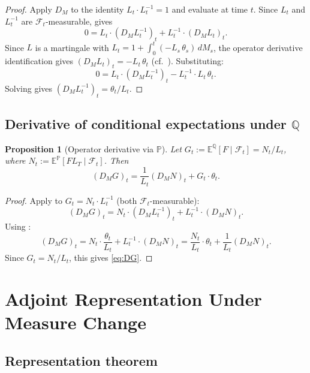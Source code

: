 \documentclass[11pt]{article}
\theoremstyle{plain}
\newtheorem{proposition}{Proposition}[section]
\theoremstyle{definition}
\theoremstyle{remark}
\newcommand{\E}{\mathbb{E}}
\newcommand{\F}{\mathcal{F}}
\newcommand{\PP}{\mathbb{P}}
\newcommand{\QQ}{\mathbb{Q}}
\begin{document}
\begin{proof}
Apply $D_M$ to the identity $L_t \cdot L_t^{-1} = 1$ and evaluate at time $t$.
Since $L_t$ and $L_t^{-1}$
are $\F_t$-measurable,  gives
\[
0 = L_t \cdot (D_M L_t^{-1})_t + L_t^{-1} \cdot (D_M L_t)_t.
\]
Since $L$ is a martingale with $L_t = 1 + \int_0^t (-L_s\,\theta_s)\,dM_s$,
the operator derivative identification gives
$(D_M L_t)_t = -L_t\,\theta_t$ (cf.~). Substituting:
\[
0 = L_t \cdot (D_M L_t^{-1})_t - L_t^{-1} \cdot L_t\,\theta_t.
\]
Solving gives $(D_M L_t^{-1})_t = \theta_t / L_t$.
\end{proof}

\subsection{Derivative of conditional expectations under $\QQ$}

\begin{proposition}[Operator derivative via $\PP$]\label{prop:DQ-via-P}
Let $G_t := \E^{\QQ}[F \mid \F_t] = N_t / L_t$, where $N_t := \E^{\PP}[F L_T \mid \F_t]$.
Then
\begin{equation}\label{eq:DG}
(D_M G)_t = \frac{1}{L_t}(D_M N)_t + G_t \cdot \theta_t.
\end{equation}
\end{proposition}

\begin{proof}
Apply  to $G_t = N_t \cdot L_t^{-1}$ (both $\F_t$-measurable):
\[
(D_M G)_t = N_t \cdot (D_M L_t^{-1})_t + L_t^{-1} \cdot (D_M N)_t.
\]
Using :
\[
(D_M G)_t = N_t \cdot \frac{\theta_t}{L_t} + L_t^{-1} \cdot (D_M N)_t
= \frac{N_t}{L_t} \cdot \theta_t + \frac{1}{L_t}(D_M N)_t.
\]
Since $G_t = N_t / L_t$, this gives \eqref{eq:DG}.
\end{proof}

\section{Adjoint Representation Under Measure Change}\label{sec:clark-ocone}

\subsection{Representation theorem}
\end{document}
